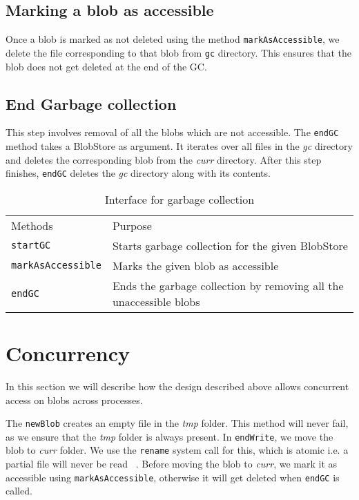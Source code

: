 \subsection{Marking a blob as accessible}
Once a blob is marked as not deleted using the method \texttt{markAsAccessible}, we delete the file corresponding to that blob from \texttt{gc} directory. This ensures that the blob does not get deleted at the end of the GC.

\subsection{End Garbage collection}
This step involves removal of all the blobs which are not accessible. The \texttt{endGC} method takes a BlobStore as argument. It iterates over all files in the \textit{gc} directory and deletes the corresponding blob from the \textit{curr} directory.
After this step finishes, \texttt{endGC} deletes the \textit{gc} directory along with its contents.

\begin{table}[hbt]
\caption{Interface for garbage collection}
\label{tab:interface-gc}
\begin{center}
  \begin{tabularx}{0.91\textwidth}{lX}
    \hline\noalign{\smallskip}
    Methods & Purpose \\
    \noalign{\smallskip}
    \hline
    \noalign{\smallskip}
    \texttt{startGC} & Starts garbage collection for the given BlobStore\\
    \texttt{markAsAccessible} & Marks the given blob as accessible\\
    \texttt{endGC} & Ends the garbage collection by removing all the unaccessible blobs\\
    \hline
  \end{tabularx}
\end{center}
\end{table}

\section{Concurrency}
In this section we will describe how the design described above allows concurrent access on blobs across processes.

The \texttt{newBlob} creates an empty file in the \textit{tmp} folder. This method will never fail, as we ensure that the \textit{tmp} folder is always present.
In \texttt{endWrite}, we move the blob to \textit{curr} folder. We use the \texttt{rename} system call for this, which is atomic i.e. a partial file will never be read ~\cite{renamemanpage}.
Before moving the blob to \textit{curr}, we mark it as accessible using \texttt{markAsAccessible}, otherwise it will get deleted when \texttt{endGC} is called.

